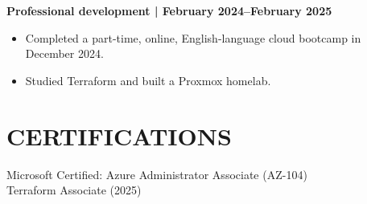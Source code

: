 \documentclass[11pt,a4paper]{article}
\begin{document}
\textbf{Professional development | February 2024–February 2025}
\begin{itemize}
\item Completed a part-time, online, English-language cloud bootcamp in December 2024.
\item Studied Terraform and built a Proxmox homelab.
\end{itemize}

\section*{CERTIFICATIONS}
Microsoft Certified: Azure Administrator Associate (AZ-104)\\
Terraform Associate (2025)
\end{document}
